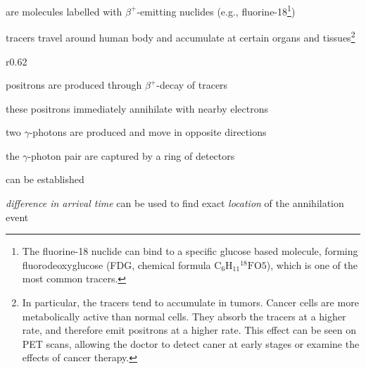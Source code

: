  are molecules labelled with $\beta^+$-emitting nuclides (e.g., fluorine-18\footnote{The fluorine-18 nuclide can bind to a specific glucose based molecule, forming fluorodeoxyglucose (FDG, chemical formula $\text{C}_6\text{H}_{11}\text{}^{18}\text{F}\text{O}5$), which is one of the most common tracers.})

tracers travel around human body and accumulate at certain organs and tissues\footnote{In particular, the tracers tend to accumulate in tumors. Cancer cells are more metabolically active than normal cells. They absorb the tracers at a higher rate, and therefore emit positrons at a higher rate. This effect can be seen on PET scans, allowing the doctor to detect caner at early stages or examine the effects of cancer therapy.}

\begin{wrapfigure}{r}{0.62\textwidth}
    \vspace*{-12pt}
    \centering
    \vspace*{-25pt}
\end{wrapfigure}

positrons are produced through $\beta^+$-decay of tracers

these positrons immediately annihilate with nearby electrons

two $\gamma$-photons are produced and move in opposite directions

the $\gamma$-photon pair are captured by a ring of detectors

 can be established

\emph{difference in arrival time} can be used to find exact \emph{location} of the annihilation event

